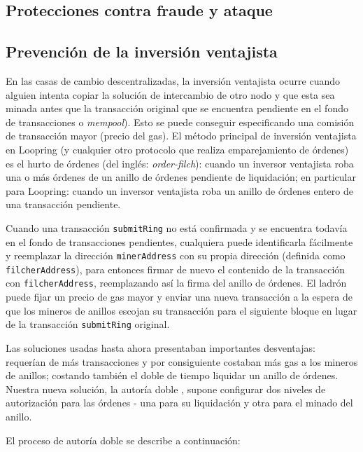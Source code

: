 \documentclass[UTF8,nofonts]{article}
\begin{document}
\begin{multicols}{2}
\section{Protecciones contra fraude y ataque}

\subsection{Prevención de la inversión ventajista\label{sec:dual_authoring}}

En las casas de cambio descentralizadas, la inversión ventajista ocurre cuando alguien intenta copiar la solución de intercambio de otro nodo y que esta sea minada antes que la transacción original que se encuentra pendiente en el fondo de transacciones o \textit{mempool}). Esto se puede conseguir especificando una comisión de transacción mayor (precio del gas). El método principal de inversión ventajista en Loopring (y cualquier otro protocolo que realiza emparejamiento de órdenes) es el hurto de órdenes (del inglés: \textit{order-filch}): cuando un inversor ventajista roba una o más órdenes de un anillo de órdenes pendiente de liquidación; en particular para Loopring: cuando un inversor ventajista roba un anillo de órdenes entero de una transacción pendiente.


Cuando una transacción \verb|submitRing| no está confirmada y se encuentra todavía en el fondo de transacciones pendientes, cualquiera puede identificarla fácilmente y reemplazar la dirección \verb|minerAddress| con su propia dirección (definida como \verb|filcherAddress|), para entonces firmar de nuevo el contenido de la transacción con  \verb|filcherAddress|, reemplazando así la firma del anillo de órdenes. El ladrón puede fijar un precio de gas mayor y enviar una nueva transacción a la espera de que los mineros de anillos escojan su transacción para el siguiente bloque en lugar de la transacción \verb|submitRing| original.


Las soluciones usadas hasta ahora presentaban importantes desventajas: requerían de más transacciones y por consiguiente costaban más gas a los mineros de anillos; costando también el doble de tiempo liquidar un anillo de órdenes. Nuestra nueva solución, la autoría doble \cite{dualauthor}, supone configurar dos niveles de autorización para las órdenes - una para su liquidación y otra para el minado del anillo.

El proceso de autoría doble se describe a continuación: 

\begin{enumerate}


\end{enumerate}
\end{multicols}
\end{document}
